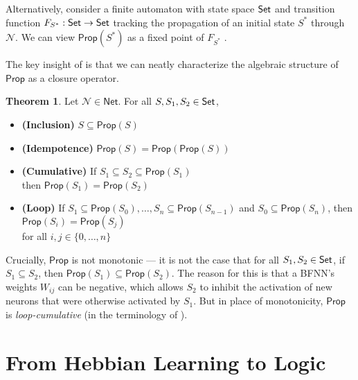 \documentclass[letterpaper]{article}
\newcommand{\Set}{\mbox{\sf Set}}
\theoremstyle{definition}
\newtheorem{theorem}{Theorem}
\newcommand{\set}[1]{\{ #1 \}}
\newcommand{\Prop}{\textsf{Prop}}
\newcommand{\AllNets}{\mathsf{Net}}
\newcommand{\Net}{\mathcal{N}}
\begin{document}
Alternatively, consider a finite automaton with state space $\Set$ and transition function $F_{S^\ast} : \Set \to \Set$ tracking the propagation of an initial state $S^\ast$ through $\Net$.  We can view $\Prop(S^\ast)$ as a fixed point of $F_{S^\ast}$ \cite{leitgeb2001nonmonotonic}.

The key insight of \cite{leitgeb2001nonmonotonic} is that we can neatly characterize the algebraic structure of $\Prop$ as a closure operator.

\begin{theorem}
Let $\Net \in \AllNets$.  For all $S, S_1, S_2 \in \Set$,
\begin{itemize}
    \item \textbf{(Inclusion)} $S \subseteq \Prop(S)$
    
    \item \textbf{(Idempotence)} $\Prop(S) = \Prop(\Prop(S))$
    
    \item \textbf{(Cumulative)} If ${S_1 \subseteq S_2 \subseteq \Prop(S_1)}$\\ then ${\Prop(S_1) = \Prop(S_2)}$
    
    \item \textbf{(Loop)} If ${S_1 \subseteq \Prop(S_0)}, \ldots, {S_n \subseteq \Prop(S_{n-1})}$ and ${S_0 \subseteq \Prop(S_n)}$, then ${\Prop(S_i) = \Prop(S_j)}$\\
    for all $i, j \in \set{0, \ldots, n}$
\end{itemize}
\end{theorem}

Crucially, $\Prop$ is not monotonic --- it is not the case that for all $S_1, S_2 \in \Set$, if $S_1 \subseteq S_2$, then $\Prop(S_1) \subseteq \Prop(S_2)$.  The reason for this is that a BFNN's weights $W_{ij}$ can be negative, which allows $S_2$ to inhibit the activation of new neurons that were otherwise activated by $S_1$.  But in place of monotonicity, $\Prop$ is \emph{loop-cumulative} (in the terminology of \cite{kraus1990nonmonotonic}).

\section{From Hebbian Learning to Logic}
\end{document}
